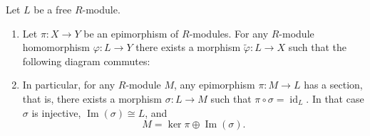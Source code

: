 \begin{proposition}
    Let $L$ be a free $R$-module.
    \begin{enumerate}
        \item Let $\pi: X\to Y$ be an epimorphism of $R$-modules. For any $R$-module homomorphism $\varphi: L \to Y$ there exists a morphism $\tilde{\varphi}: L \to X$ such that the following diagram commutes:
              \begin{center}
              \end{center}
        \item In particular, for any $R$-module $M$, any epimorphism $\pi: M \to L$ has a section, that is, there exists a morphism $\sigma: L \to M$ such that $\pi \circ \sigma = \operatorname{id}_L$. In that case $\sigma$ is injective, $\operatorname{Im}(\sigma)\cong L$, and
              \[
                  M = \ker \pi \oplus \operatorname{Im}(\sigma).
              \]
              \begin{center}
              \end{center}
    \end{enumerate}
\end{proposition}

